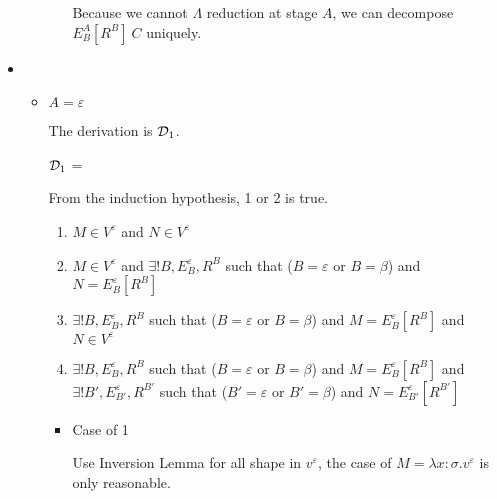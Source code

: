 \begin{itemize}
\begin{itemize}
\begin{itemize}
	      	      	      Because we cannot $\Lambda$ reduction at stage $A$, we can decompose $E^A_B[R^B]\ C$ uniquely.
	      	      \end{itemize}
	      	      	      	      
	      	      	      	      
	      \end{itemize}
	      	      
	\item \TApp
	      	      
	      \begin{itemize}
	      	\item $ A = \varepsilon$
	      	      	      	      
	      	      The derivation is $\mathcal{D}_1$.
	      	      	      	      
	      	      $\mathcal{D}_1$ = 
	      	      { \andalso {}}
	      	      	      	      
	      	      From the induction hypothesis, 1 or 2 is true.
	      	      	      	      
	      	      \begin{enumerate}
	      	      	\item $ M \in V^\varepsilon$ and $ N \in V^\varepsilon$
	      	      	\item $ M \in V^\varepsilon$ and $\exists ! B, E^\varepsilon_B, R^B$ such that ($B = \varepsilon$ or $B = \beta$) and $N = E^\varepsilon_B[R^B]$
	      	      	\item $\exists ! B, E^\varepsilon_B, R^B$ such that ($B = \varepsilon$ or $B = \beta$) and $M = E^\varepsilon_B[R^B]$ and $ N \in V^\varepsilon$
	      	      	\item $\exists ! B, E^\varepsilon_B, R^B$ such that ($B = \varepsilon$ or $B = \beta$) and $M = E^\varepsilon_B[R^B]$ and $\exists ! B', E^\varepsilon_{B'}, R^{B'}$ such that ($B' = \varepsilon$ or $B' = \beta$) and $N = E^\varepsilon_{B'}[R^{B'}]$
	      	      \end{enumerate}
	      	      	      	      
	      	      \begin{itemize}
	      	      	\item Case of 1
	      	      	      	      	      	      
	      	      	      Use Inversion Lemma for all shape in $v^\varepsilon$, the case of $ M = \lambda x:\sigma.v^\varepsilon$ is only reasonable.
	      	      	      	      	      	      

\end{itemize}
\end{itemize}
\end{itemize}
